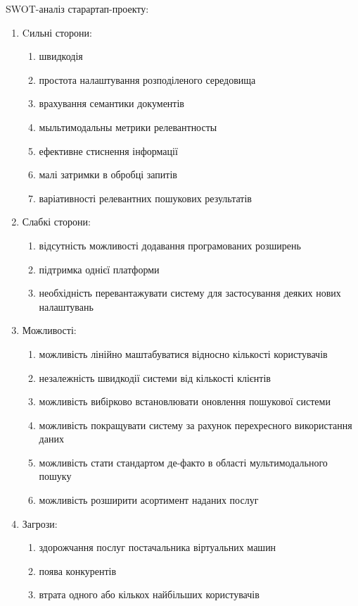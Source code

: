 \pagebreak
SWOT-аналіз старартап-проекту:
\begin{enumerate}
	\item Cильні сторони:
	\begin{enumerate}
		\item швидкодія
		\item простота налаштування розподіленого середовища
		\item врахування семантики документів
		\item мыльтимодальны метрики релевантносты
		\item ефективне стиснення інформації
		\item малі затримки в обробці запитів
		\item варіативності релевантних пошукових результатів
	\end{enumerate}
	\item Слабкі сторони:
	\begin{enumerate}
		\item відсутність можливості додавання програмованих розширень
		\item підтримка однієї платформи
		\item необхідність перевантажувати систему для застосування деяких нових налаштувань
	\end{enumerate}
	\item Можливості:
	\begin{enumerate}
		\item можливість лінійно маштабуватися відносно кількості користувачів
		\item незалежність швидкодії системи від кількості клієнтів
		\item можливість вибірково встановлювати оновлення пошукової системи
		\item можливість покращувати систему за рахунок перехресного використання даних
		\item можливість стати стандартом де-факто в області мультимодального пошуку
		\item можливість розширити асортимент наданих послуг
	\end{enumerate}
	\item Загрози:
	\begin{enumerate}
		\item здорожчання послуг постачальника віртуальних машин
		\item поява конкурентів
		\item втрата одного або кількох найбільших користувачів
	\end{enumerate}
\end{enumerate}

